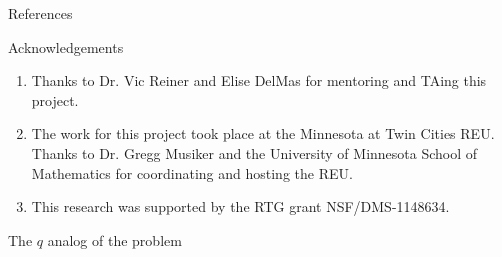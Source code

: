 \documentclass{beamer}
\theoremstyle{remark}
\begin{document}
\begin{frame}{References}
\nocite{quotients_stanley}
\nocite{algebraic_stanley}


\end{frame}


\begin{frame}{Acknowledgements}
\begin{enumerate}
\item Thanks to Dr. Vic Reiner and Elise DelMas for mentoring and TAing this project.
\item The work for this project took place at the Minnesota at Twin Cities REU.  Thanks to Dr. Gregg Musiker and the University of Minnesota School of Mathematics for coordinating and hosting the REU.
\item This research was supported by the RTG grant NSF/DMS-1148634.
\end{enumerate}
\end{frame}





\begin{frame}{The $q$ analog of the problem}

\end{frame}
\end{document}
